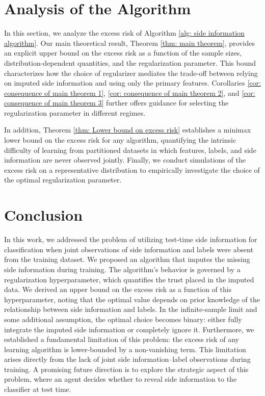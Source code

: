 \documentclass[ejs]{imsart}
\numberwithin{equation}{section}
\theoremstyle{plain}
\theoremstyle{definition}
\theoremstyle{remark}
\begin{document}




\section{Analysis of the Algorithm}

In this section, we analyze the excess risk of Algorithm \ref{alg: side information algorithm}. Our main theoretical result, Theorem \ref{thm: main theorem}, provides an explicit upper bound on the excess risk as a function of the sample sizes, distribution-dependent quantities, and the regularization parameter. This bound characterizes how the choice of regularizer mediates the trade-off between relying on imputed side information and using only the primary features. Corollaries \ref{cor: consequence of main theorem 1}, \ref{cor: consequence of main theorem 2}, and \ref{cor: consequence of main theorem 3} further offers guidance for selecting the regularization parameter in different regimes.

In addition, Theorem \ref{thm: Lower bound on excess risk} establishes a minimax lower bound on the excess risk for any algorithm, quantifying the intrinsic difficulty of learning from partitioned datasets in which features, labels, and side information are never observed jointly. Finally, we conduct simulations of the excess risk on a representative distribution to empirically investigate the choice of the optimal regularization parameter.








\section{Conclusion}

In this work, we addressed the problem of utilizing test-time side information for classification when joint observations of side information and labels were absent from the training dataset. We proposed an algorithm that imputes the missing side information during training. The algorithm's behavior is governed by a regularization hyperparameter, which quantifies the trust placed in the imputed data. We derived an upper bound on the excess risk as a function of this hyperparameter, noting that the optimal value depends on prior knowledge of the relationship between side information and labels. In the infinite-sample limit and some additional assumption, the optimal choice becomes binary: either fully integrate the imputed side information or completely ignore it. Furthermore, we established a fundamental limitation of this problem: the excess risk of any learning algorithm is lower-bounded by a non-vanishing term. This limitation arises directly from the lack of joint side information–label observations during training. A promising future direction is to explore the strategic aspect of this problem, where an agent decides whether to reveal side information to the classifier at test time.
\end{document}
